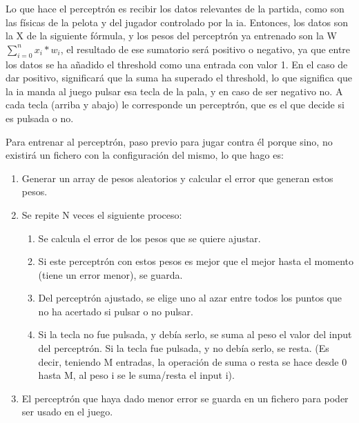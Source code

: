 Lo que hace el perceptrón es recibir los datos relevantes de la partida, como son las físicas de la pelota y del jugador controlado por la \gls{ia}. Entonces, los datos son la X de la siguiente fórmula, y los pesos del perceptrón ya entrenado son la W  $\sum_{i=0}^{n}x_i*w_i$, el resultado de ese sumatorio será positivo o negativo, ya que entre los datos se ha añadido el threshold como una entrada con valor 1. En el caso de dar positivo, significará que la suma ha superado el threshold, lo que significa que la \gls{ia} manda al juego pulsar esa tecla de la pala, y en caso de ser negativo no. A cada tecla (arriba y abajo) le corresponde un perceptrón, que es el que decide si es pulsada o no.

Para entrenar al perceptrón, paso previo para jugar contra él porque sino, no existirá un fichero con la configuración del mismo, lo que hago es:
\begin{enumerate}
	\item Generar un array de pesos aleatorios y calcular el error que generan estos pesos.
	\item Se repite N veces el siguiente proceso:
	\begin{enumerate}
		\item Se calcula el error de los pesos que se quiere ajustar.
		\item Si este perceptrón con estos pesos es mejor que el mejor hasta el momento (tiene un error menor), se guarda.
		\item Del perceptrón ajustado, se elige uno al azar entre todos los puntos que no ha acertado si pulsar o no pulsar. 
		\item Si la tecla no fue pulsada, y debía serlo, se suma al peso el valor del input del perceptrón. Si la tecla fue pulsada, y no debía serlo, se resta. (Es decir, teniendo M entradas, la operación de suma o resta se hace desde 0 hasta M, al peso i se le suma/resta el input i).
	\end{enumerate}
	\item El perceptrón que haya dado menor error se guarda en un fichero para poder ser usado en el juego.
\end{enumerate}


